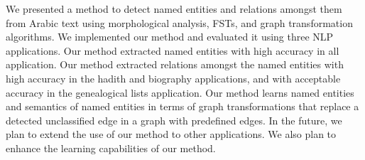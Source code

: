 \documentclass{llncs}
\begin{document}
We presented a method to detect named entities and relations amongst them from 
Arabic text using morphological analysis, FSTs, and 
graph transformation algorithms. 
We implemented our method and evaluated it using three NLP applications.
Our method extracted named entities with high accuracy in all application.
Our method extracted relations amongst the named entities with high accuracy in the hadith and biography applications, 
and with acceptable accuracy in the genealogical lists application. 
Our method learns named entities and semantics of named entities in terms of graph transformations that 
replace a detected unclassified edge in a graph with predefined edges. 
In the future, we plan to extend the use of our method to other applications. 
We also plan to enhance the learning capabilities of our method.







\end{document}
